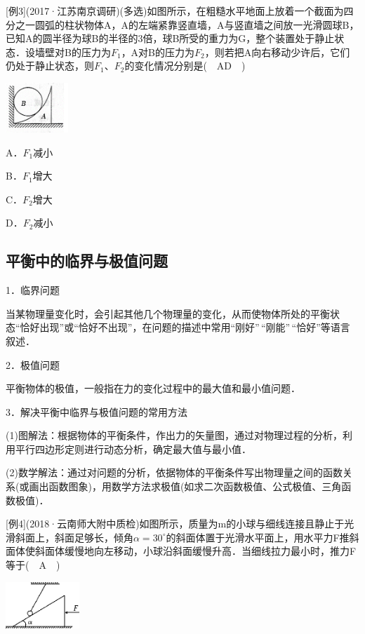 \documentclass[cn,10.5pt,chinese,mac,chinesefont=founder]{elegantbook}
\begin{document}
{[}例3{]}(2017·江苏南京调研)(多选)如图所示，在粗糙水平地面上放着一个截面为四分之一圆弧的柱状物体A，A的左端紧靠竖直墙，A与竖直墙之间放一光滑圆球B，已知A的圆半径为球B的半径的3倍，球B所受的重力为G，整个装置处于静止状态．设墙壁对B的压力为$F_1$，A对B的压力为$F_2$，则若把A向右移动少许后，它们仍处于静止状态，则$F_1$、$F_2$的变化情况分别是(　AD　)

\begin{center}\includegraphics[width=0.92708in,height=0.73958in]{media/image86.png}\end{center}

A．$F_1$减小 

B．$F_1$增大

C．$F_2$增大 

D．$F_2$减小
\newpage
\subsection{平衡中的临界与极值问题}

1．临界问题

当某物理量变化时，会引起其他几个物理量的变化，从而使物体所处的平衡状态``恰好出现''或``恰好不出现''，在问题的描述中常用``刚好''\,``刚能''\,``恰好''等语言叙述．

2．极值问题

平衡物体的极值，一般指在力的变化过程中的最大值和最小值问题．

3．解决平衡中临界与极值问题的常用方法

(1)图解法：根据物体的平衡条件，作出力的矢量图，通过对物理过程的分析，利用平行四边形定则进行动态分析，确定最大值与最小值．

(2)数学解法：通过对问题的分析，依据物体的平衡条件写出物理量之间的函数关系(或画出函数图象)，用数学方法求极值(如求二次函数极值、公式极值、三角函数极值)．

{[}例4{]}(2018·云南师大附中质检)如图所示，质量为m的小球与细线连接且静止于光滑斜面上，斜面足够长，倾角$\alpha=30^\circ$的斜面体置于光滑水平面上，用水平力F推斜面体使斜面体缓慢地向左移动，小球沿斜面缓慢升高．当细线拉力最小时，推力F等于(　A　)

\begin{center}\includegraphics[width=1.09375in,height=0.6875in]{media/image87.png}\end{center}
\end{document}

